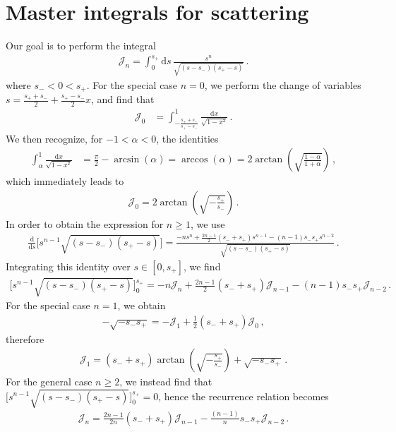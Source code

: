 \documentclass[prd,superscriptaddress,preprintnumbers,tightenlines,nofootinbib, eqsecnum]{revtex4-2}
\renewcommand{\dd}{\mathrm{d}}
\begin{document}
\section{Master integrals for scattering}
\label{app:integrals}
Our goal is to perform the integral 
\begin{align}
    \mathcal{J}_n=\int_0^{s_+}\dd s \, \frac{s^n}{\sqrt{(s-s_-)(s_+-s)}} \,.
\end{align}
where $s_-<0<s_+$.
For the special case $n=0$,
we perform the change of variables
$s=\frac{s_++s_-}{2}+\frac{s_+-s_-}{2}x$, and find that
\begin{align}
    \mathcal{J}_0&=\int_{-\frac{s_++s_-}{s_+-s_-}}^{1}\frac{\dd x}{\sqrt{1-x^2}} \,.
\end{align}
We then recognize, for $-1<\alpha<0$, the identities
\begin{align}
   \int_{\alpha}^{1}\frac{\dd x}{\sqrt{1-x^2}}&= \frac{\pi}{2}-\arcsin\left(\alpha\right)=\arccos(\alpha) = 2 \arctan\left(\sqrt{\frac{1-\alpha}{1+\alpha}}\right) \,,
\end{align}
which immediately leads to 
\begin{align}\label{eq:J0_expression}
    \mathcal{J}_0 = 2 \arctan\left(\sqrt{-\frac{s_+}{s_-}}\right)\,.
\end{align}
In order to obtain the expression for $n\ge 1$, we use 
%
\begin{align}
    \frac{\dd}{\dd s} \Big[s^{n-1}\sqrt{(s-s_-)(s_+-s)}\Big] = \frac{-ns^n + \frac{2n-1}{2}(s_-+s_+) s^{n-1} - (n-1)s_-s_+s^{n-2}}{\sqrt{(s-s_-)(s_+-s) }} \,.
\end{align}
Integrating this identity over $s\in[0,s_+]$, we find
\begin{align}
    \Big[s^{n-1}\sqrt{(s-s_-)(s_+-s)}\Big]_0^{s_+} = - n \mathcal{J}_n + \frac{2n-1}{2}(s_-+s_+) \mathcal{J}_{n-1} - (n-1)s_-s_+ \mathcal{J}_{n-2} \,.
\end{align}
For the special case $n=1$, we obtain
\begin{align}
    -\sqrt{-s_- s_+}= - \mathcal{J}_1 +\frac{1}{2}(s_-+s_+)\mathcal{J}_0 \,,
\end{align}
therefore
\begin{align}
    \mathcal{J}_1= (s_-+s_+) \arctan\left(\sqrt{-\frac{s_+}{s_-}}\right) + \sqrt{-s_-s_+} \,.
\end{align}
For the general case $n\ge2$, we instead find that $\Big[s^{n-1}\sqrt{(s-s_-)(s_+-s)}\Big]_0^{s_+}=0$, hence the recurrence relation becomes
\begin{align}
    \mathcal{J}_n =  \frac{2n-1}{2n}(s_-+s_+) \mathcal{J}_{n-1} - \frac{(n-1)}{n}s_-s_+ \mathcal{J}_{n-2}\,.
\end{align}
\end{document}
